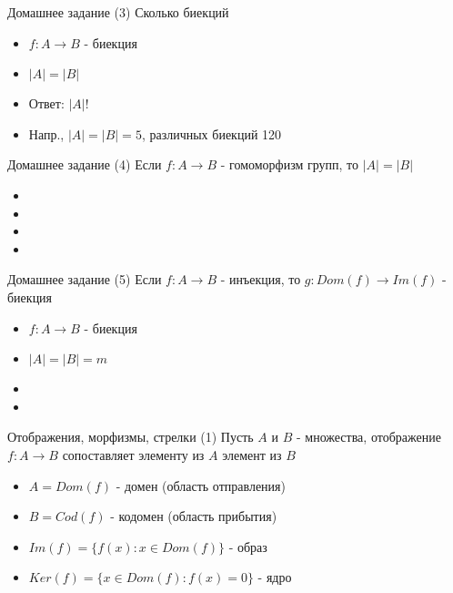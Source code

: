 \documentclass{beamer}
\begin{document}
\begin{frame}{Домашнее задание (3)}
Сколько биекций\\
  \begin{itemize}
    \item $f : A \to B$ - биекция
    \item $\left\vert{A}\right\vert = \left\vert{B}\right\vert$
    \item Ответ: $\left\vert{A}\right\vert!$
    \item Напр., $\left\vert{A}\right\vert = \left\vert{B}\right\vert = 5$, различных биекций 120 
  \end{itemize}  
\end{frame}

\begin{frame}{Домашнее задание (4)}
Если $f : A \to B$ - гомоморфизм групп, то $\left\vert{A}\right\vert = \left\vert{B}\right\vert$ 
  \begin{itemize}
    \item 
    \item 
    \item 
    \item 
  \end{itemize}  
\end{frame}

\begin{frame}{Домашнее задание (5)}
Если $f : A \to B$ - инъекция, то $g: Dom(f) \to Im(f)$ - биекция\\
  \begin{itemize}
    \item $f : A \to B$ - биекция
    \item $\left\vert{A}\right\vert = \left\vert{B}\right\vert = m$
    \item 
    \item 
  \end{itemize}  
\end{frame}


\begin{frame}{Отображения, морфизмы, стрелки (1)}
Пусть $A$ и $B$ - множества, отображение $f : A \to B$ сопоставляет элементу из $A$ элемент из $B$\\
  \begin{itemize}
    \item $A = Dom(f)$ - домен (область отправления)
    \item $B = Cod(f)$ - кодомен (область прибытия) 
    \item $Im(f) = \{f(x) : x \in Dom(f)\}$ - образ 
    \item $Ker(f) = \{x \in Dom(f) : f(x) = 0\}$ - ядро 
  \end{itemize}
\end{frame}
\end{document}
